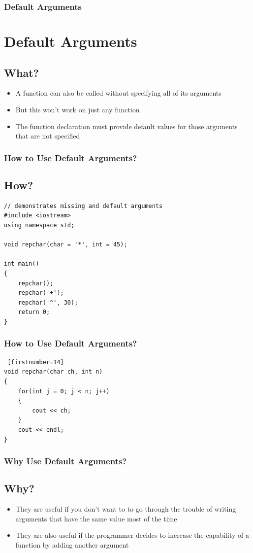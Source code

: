 \documentclass{beamer}
\begin{document}
\begin{frame}\frametitle{Default Arguments}
    \section{Default Arguments} %
    \label{sec:default_arguments}
    \subsection{What?} %
    \label{sub:what_}
    \begin{itemize}
        \item A function can also be called without specifying all of its arguments
        \item But this won't work on just any function
        \item The function declaration must provide default values for those arguments that are not specified
    \end{itemize}
\end{frame}

\begin{frame}[fragile]\frametitle{How to Use Default Arguments?}
    \subsection{How?} %
    \label{sub:how_}
    \lstset{style=mystyle}
\begin{lstlisting}
// demonstrates missing and default arguments
#include <iostream>
using namespace std;

void repchar(char = '*', int = 45);

int main()
{
    repchar();
    repchar('+');
    repchar('^', 30);
    return 0;
}
\end{lstlisting}
\end{frame}

\begin{frame}[fragile]\frametitle{How to Use Default Arguments?}
    \lstset{style=mystyle}
\begin{lstlisting} [firstnumber=14]
void repchar(char ch, int n)
{
    for(int j = 0; j < n; j++)
    {
        cout << ch;
    }
    cout << endl;
}
\end{lstlisting}
\end{frame}

\begin{frame}\frametitle{Why Use Default Arguments?}
\subsection{Why?} %
\label{sub:why_}
\begin{itemize}
    \item They are useful if you don't want to to go through the trouble of writing arguments that have the same value most of the time
    \item They are also useful if the programmer decides to increase the capability of a function by adding another argument
\end{itemize}
\end{frame}
\end{document}
